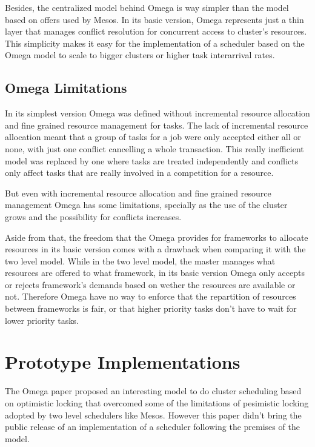 \documentclass{report}                     %
\begin{document}
Besides, the centralized model behind Omega is way simpler than the
model based on offers used by Mesos. In its basic version, Omega
represents just a thin layer that manages conflict resolution for
concurrent access to cluster's resources. This simplicity makes it
easy for the implementation of a scheduler based on the Omega model to
scale to bigger clusters or higher task interarrival rates.

\section{Omega Limitations}

In its simplest version Omega was defined without incremental
resource allocation and fine grained resource management for tasks.
The lack of incremental resource allocation meant that a group of
tasks for a job were only accepted either all or none, with just one
conflict cancelling a whole transaction. This really inefficient model
was replaced by one where tasks are treated independently and
conflicts only affect tasks that are really involved in a competition
for a resource.

But even with incremental resource allocation and fine grained
resource management Omega has some limitations, specially as the
use of the cluster grows and the possibility for conflicts
increases. 

Aside from that, the freedom that the Omega provides for frameworks to
allocate resources in its basic version comes with a drawback when
comparing it with the two level model. While in the two level model,
the master manages what resources are offered to what framework, in
its basic version Omega only accepts or rejects framework's demands
based on wether the resources are available or not.  Therefore Omega
have no way to enforce that the repartition of resources between
frameworks is fair, or that higher priority tasks don't have to wait
for lower priority tasks.

\chapter{Prototype Implementations}
\label{sec:implementation}

The Omega paper proposed an interesting model to do cluster
scheduling based on optimistic locking that overcomed some of the
limitations of pesimistic locking adopted by two level schedulers like
Mesos. However this paper didn't bring the public release of an
implementation of a scheduler following the premises of the
model. 
\end{document}

